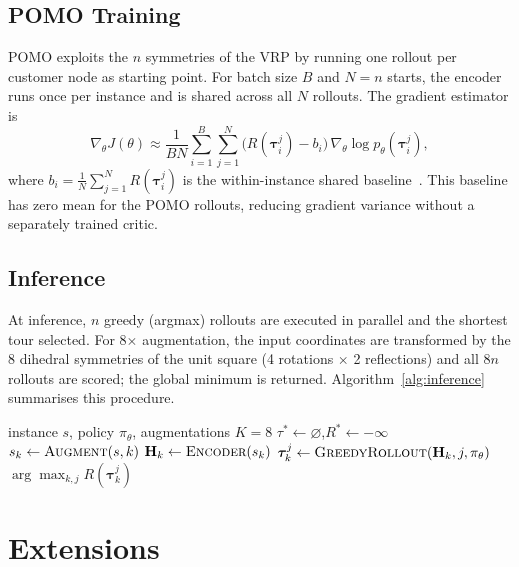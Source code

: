 \documentclass[conference]{IEEEtran}
\begin{document}
\subsection{POMO Training}

POMO exploits the $n$ symmetries of the VRP by running one rollout per
customer node as starting point. For batch size $B$ and $N=n$ starts, the
encoder runs once per instance and is shared across all $N$ rollouts. The
gradient estimator is
\begin{equation}
  \nabla_\theta J(\theta) \approx \frac{1}{BN}
  \sum_{i=1}^{B}\sum_{j=1}^{N}
  \bigl(R(\bm{\tau}_i^j) - b_i\bigr)\,
  \nabla_\theta \log p_\theta(\bm{\tau}_i^j),
\end{equation}
where $b_i = \frac{1}{N}\sum_{j=1}^N R(\bm{\tau}_i^j)$ is the
within-instance shared baseline~\cite{kwon2020pomo}. This baseline has zero
mean for the POMO rollouts, reducing gradient variance without a separately
trained critic.

\subsection{Inference}

At inference, $n$ greedy (argmax) rollouts are executed in parallel and the
shortest tour selected. For 8$\times$ augmentation, the input coordinates
are transformed by the 8 dihedral symmetries of the unit square (4 rotations
$\times$ 2 reflections) and all $8n$ rollouts are scored; the global minimum
is returned. Algorithm~\ref{alg:inference} summarises this procedure.

\begin{algorithm}[t]
\caption{POMO Inference with Augmentation}
\label{alg:inference}
\begin{algorithmic}[1]
\REQUIRE instance $s$, policy $\pi_\theta$, augmentations $K=8$
\STATE $\tau^* \leftarrow \varnothing$,\quad $R^* \leftarrow -\infty$
  \STATE $s_k \leftarrow \textsc{Augment}(s, k)$
  \STATE $\mathbf{H}_k \leftarrow \textsc{Encoder}(s_k)$
    \STATE $\bm{\tau}_k^j \leftarrow \textsc{GreedyRollout}(\mathbf{H}_k, j, \pi_\theta)$
  \ENDFOR
\ENDFOR
\RETURN $\arg\max_{k,j} R(\bm{\tau}_k^j)$
\end{algorithmic}
\end{algorithm}

\section{Extensions}
\end{document}
